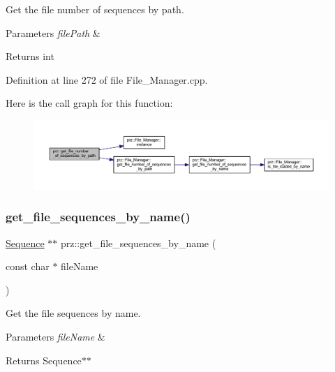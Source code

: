 Get the file number of sequences by path. 


\begin{DoxyParams}{Parameters}
{\em file\+Path} & \\
\hline
\end{DoxyParams}
\begin{DoxyReturn}{Returns}
int 
\end{DoxyReturn}


Definition at line 272 of file File\+\_\+\+Manager.\+cpp.

Here is the call graph for this function\+:
\nopagebreak
\begin{figure}[H]
\begin{center}
\leavevmode
\includegraphics[width=350pt]{namespaceprz_aea902bbb73266b76bd53325b0c23da4c_cgraph}
\end{center}
\end{figure}
\mbox{\label{namespaceprz_a1bf460cd725d36d217e1a94ea659038e}} 
\subsubsection{\texorpdfstring{get\_file\_sequences\_by\_name()}{get\_file\_sequences\_by\_name()}}
{\footnotesize\ttfamily \mbox{\hyperlink{classprz_1_1_sequence}{Sequence}} $\ast$$\ast$ prz\+::get\+\_\+file\+\_\+sequences\+\_\+by\+\_\+name (\begin{DoxyParamCaption}\item[{const char $\ast$}]{file\+Name }\end{DoxyParamCaption})}



Get the file sequences by name. 


\begin{DoxyParams}{Parameters}
{\em file\+Name} & \\
\hline
\end{DoxyParams}
\begin{DoxyReturn}{Returns}
Sequence$\ast$$\ast$ 
\end{DoxyReturn}


